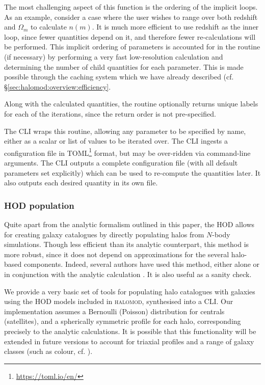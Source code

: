 \documentclass[5p]{elsarticle}
\begin{document}
The most challenging aspect of this function is the ordering of the implicit loops. As an example, consider a case where the user wishes to range over both redshift and $\Omega_m$ to calculate $n(m)$. It is much more efficient to use redshift as the inner loop, since fewer quantities depend on it, and therefore fewer re-calculations will be performed. This implicit ordering of parameters is accounted for in the routine (if necessary) by performing a very fast low-resolution calculation and determining the number of child quantities for each parameter. This is made possible through the caching system which we have already described (cf. \S\ref{sec:halomod:overview:efficiency}.

Along with the calculated quantities, the routine optionally returns unique labels for each of the iterations, since the return order is not pre-specified.

The CLI wraps this routine, allowing any parameter to be specified by name, either as a scalar or list of values to be iterated over. The CLI ingests a configuration file in \textsc{TOML}\footnote{\url{https://toml.io/en/}} format, but may be over-ridden via command-line arguments. The CLI outputs a complete configuration file (with all default parameters set explicitly) which can be used to re-compute the quantities later. It also outputs each desired quantity in its own file. 


\subsubsection{HOD population}
\label{sec:halomod:extra:pophod}
Quite apart from the analytic formalism outlined in this paper, the HOD allows for creating galaxy catalogues by directly populating halos from $N$-body simulations. Though less efficient than its analytic counterpart, this method is more robust, since it does not depend on approximations for the several halo-based components. Indeed, several authors have used this method, either alone or in conjunction with the analytic calculation \citep{Skibba2015,Zheng2015}. It is also useful as a sanity check.

We provide a very basic set of tools for populating halo catalogues with galaxies using the HOD models included in \textsc{halomod}, synthesised into a CLI. Our implementation assumes a Bernoulli (Poisson) distribution for centrals (satellites), and a spherically symmetric profile for each halo, corresponding precisely to the analytic calculations. It is possible that this functionality will be extended in future versions to account for triaxial profiles \citep{Jing2002} and a range of galaxy classes (such as colour, cf. \citet{Skibba2009}). 
\end{document}
